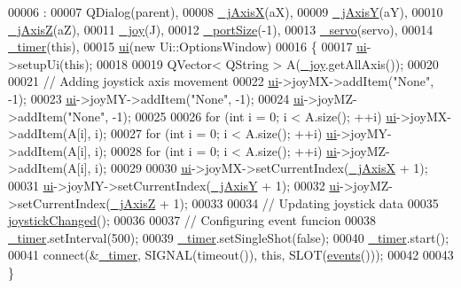 \begin{DoxyCode}
00006                                                                 :
00007     QDialog(parent),
00008     \hyperlink{a00005_a01d6284355011203ee6e8856a0bdf557}{\_jAxisX}(aX),
00009     \hyperlink{a00005_a8921d1cc5bcb527466c28feb5dcc59b1}{\_jAxisY}(aY),
00010     \hyperlink{a00005_a47409f50a87942706baaea3d025785e3}{\_jAxisZ}(aZ),
00011     \hyperlink{a00005_a1bf846ab681ab245f70adac30999947c}{\_joy}(J),
00012     \hyperlink{a00005_a9bd4dccc7a544b1db78dc8cf330b88f6}{\_portSize}(-1),
00013     \hyperlink{a00005_acba1566fea3f831000d5e1c1edc3e776}{\_servo}(servo),
00014     \hyperlink{a00005_af6320942b8558140989f552b3bbc1fbd}{\_timer}(\textcolor{keyword}{this}),
00015     \hyperlink{a00005_a8347442d5b3b670e8fff0c4102db1f88}{ui}(\textcolor{keyword}{new} Ui::OptionsWindow)
00016 \{
00017     \hyperlink{a00005_a8347442d5b3b670e8fff0c4102db1f88}{ui}->setupUi(\textcolor{keyword}{this});
00018     
00019     QVector< QString > A(\hyperlink{a00005_a1bf846ab681ab245f70adac30999947c}{\_joy}.getAllAxis());
00020     
00021     \textcolor{comment}{// Adding joystick axis movement}
00022     \hyperlink{a00005_a8347442d5b3b670e8fff0c4102db1f88}{ui}->joyMX->addItem(\textcolor{stringliteral}{"None"}, -1);
00023     \hyperlink{a00005_a8347442d5b3b670e8fff0c4102db1f88}{ui}->joyMY->addItem(\textcolor{stringliteral}{"None"}, -1);
00024     \hyperlink{a00005_a8347442d5b3b670e8fff0c4102db1f88}{ui}->joyMZ->addItem(\textcolor{stringliteral}{"None"}, -1);
00025     
00026     \textcolor{keywordflow}{for} (\textcolor{keywordtype}{int} i = 0; i < A.size(); ++i) \hyperlink{a00005_a8347442d5b3b670e8fff0c4102db1f88}{ui}->joyMX->addItem(A[i], i);
00027     \textcolor{keywordflow}{for} (\textcolor{keywordtype}{int} i = 0; i < A.size(); ++i) \hyperlink{a00005_a8347442d5b3b670e8fff0c4102db1f88}{ui}->joyMY->addItem(A[i], i);
00028     \textcolor{keywordflow}{for} (\textcolor{keywordtype}{int} i = 0; i < A.size(); ++i) \hyperlink{a00005_a8347442d5b3b670e8fff0c4102db1f88}{ui}->joyMZ->addItem(A[i], i);
00029     
00030     \hyperlink{a00005_a8347442d5b3b670e8fff0c4102db1f88}{ui}->joyMX->setCurrentIndex(\hyperlink{a00005_a01d6284355011203ee6e8856a0bdf557}{\_jAxisX} + 1);
00031     \hyperlink{a00005_a8347442d5b3b670e8fff0c4102db1f88}{ui}->joyMY->setCurrentIndex(\hyperlink{a00005_a8921d1cc5bcb527466c28feb5dcc59b1}{\_jAxisY} + 1);
00032     \hyperlink{a00005_a8347442d5b3b670e8fff0c4102db1f88}{ui}->joyMZ->setCurrentIndex(\hyperlink{a00005_a47409f50a87942706baaea3d025785e3}{\_jAxisZ} + 1);
00033     
00034     \textcolor{comment}{// Updating joystick data}
00035     \hyperlink{a00005_ae8c0373be58da710194f8d14f1c3c4dc}{joystickChanged}();
00036     
00037     \textcolor{comment}{// Configuring event funcion}
00038     \hyperlink{a00005_af6320942b8558140989f552b3bbc1fbd}{\_timer}.setInterval(500);
00039     \hyperlink{a00005_af6320942b8558140989f552b3bbc1fbd}{\_timer}.setSingleShot(\textcolor{keyword}{false});
00040     \hyperlink{a00005_af6320942b8558140989f552b3bbc1fbd}{\_timer}.start();
00041     connect(&\hyperlink{a00005_af6320942b8558140989f552b3bbc1fbd}{\_timer}, SIGNAL(timeout()), \textcolor{keyword}{this}, SLOT(\hyperlink{a00005_a18763ff318688083c7ee5a21f22e8e98}{events}()));
00042     
00043 \}
\end{DoxyCode}
